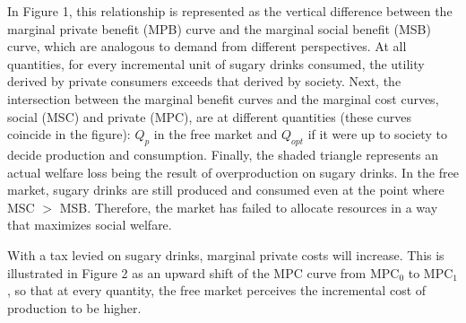 \documentclass[12pt]{article}
\begin{document}
\begin{center}
	
\end{center}

In Figure 1, this relationship is represented as the vertical difference between the marginal private benefit (MPB) curve and the marginal social benefit (MSB) curve, which are analogous to demand from different perspectives. At all quantities, for every incremental unit of sugary drinks consumed, the utility derived by private consumers exceeds that derived by society. Next, the intersection between the marginal benefit curves and the marginal cost curves, social (MSC) and private (MPC), are at different quantities (these curves coincide in the figure): $Q_p$ in the free market and $Q_{opt}$ if it were up to society to decide production and consumption. Finally, the shaded triangle represents an actual welfare loss being the result of overproduction on sugary drinks. In the free market, sugary drinks are still produced and consumed even at the point where MSC $>$ MSB. Therefore, the market has failed to allocate resources in a way that maximizes social welfare.


\vspace{\baselineskip}

With a tax levied on sugary drinks, marginal private costs will increase. This is illustrated in Figure 2 as an upward shift of the MPC curve from $\textrm{MPC}_0$ to $\textrm{MPC}_1$, so that at every quantity, the free market perceives the incremental cost of production to be higher.

\vspace{\baselineskip}
\end{document}

